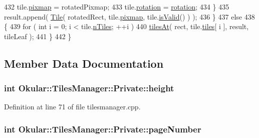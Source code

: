 \begin{DoxyCode}
432             tile.\hyperlink{classOkular_1_1TileNode_a6f1530e7484013655499145b83debc0d}{pixmap} = rotatedPixmap;
433             tile.\hyperlink{classOkular_1_1TileNode_a42e2fd93c34cc3a9bedaf23f0448e40f}{rotation} = \hyperlink{classTilesManager_1_1Private_a7f3af32831b85f1c108fb428b9f634d2}{rotation};
434         \}
435         result.append( \hyperlink{classOkular_1_1Tile}{Tile}( rotatedRect, tile.\hyperlink{classOkular_1_1TileNode_a6f1530e7484013655499145b83debc0d}{pixmap}, tile.\hyperlink{classOkular_1_1TileNode_a2e8451a76338513fc71653e763d0262f}{isValid}() ) );
436     \}
437     \textcolor{keywordflow}{else}
438     \{
439         \textcolor{keywordflow}{for} ( \textcolor{keywordtype}{int} i = 0; i < tile.\hyperlink{classOkular_1_1TileNode_ab5af51178fe629bbee781d656671eaf5}{nTiles}; ++i )
440             \hyperlink{classTilesManager_1_1Private_a376b491f94a16015e7a1b019bb9c1165}{tilesAt}( rect, tile.\hyperlink{classOkular_1_1TileNode_a5b2ae780071fcc4d535e69cd50ea5f4f}{tiles}[ i ], result, tileLeaf );
441     \}
442 \}
\end{DoxyCode}


\subsection{Member Data Documentation}
\hypertarget{classTilesManager_1_1Private_a3a34c3fae7f5b48be600e1bf2cf8536f}{
\subsubsection[{height}]{\setlength{\rightskip}{0pt plus 5cm}int Okular\+::\+Tiles\+Manager\+::\+Private\+::height}}\label{classTilesManager_1_1Private_a3a34c3fae7f5b48be600e1bf2cf8536f}


Definition at line 71 of file tilesmanager.\+cpp.

\hypertarget{classTilesManager_1_1Private_ad4869e0390201b58e4b767795d98191d}{
\subsubsection[{page\+Number}]{\setlength{\rightskip}{0pt plus 5cm}int Okular\+::\+Tiles\+Manager\+::\+Private\+::page\+Number}}\label{classTilesManager_1_1Private_ad4869e0390201b58e4b767795d98191d}


